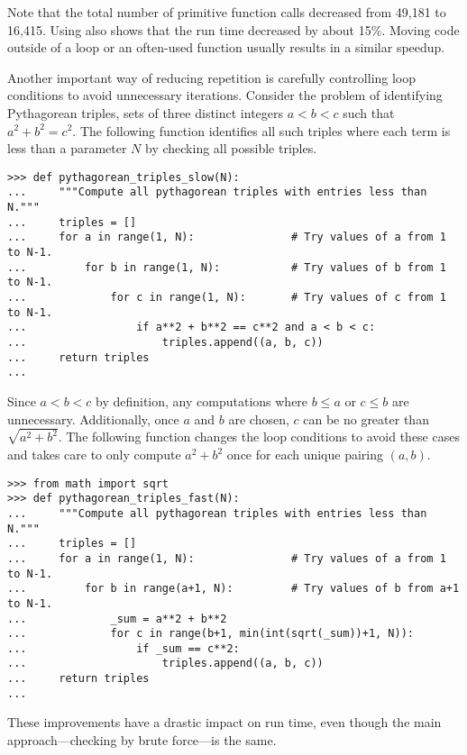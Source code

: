 Note that the total number of primitive function calls decreased from 49,181 to 16,415.
Using  also shows that the run time decreased by about 15\%.
Moving code outside of a loop or an often-used function usually results in a similar speedup.

Another important way of reducing repetition is carefully controlling loop conditions to avoid unnecessary iterations.
Consider the problem of identifying Pythagorean triples, sets of three distinct integers $a < b < c$ such that $a^2 + b^2 = c^2$.
The following function identifies all such triples where each term is less than a parameter $N$ by checking all possible triples.

\begin{lstlisting}
>>> def pythagorean_triples_slow(N):
...     """Compute all pythagorean triples with entries less than N."""
...     triples = []
...     for a in range(1, N):               # Try values of a from 1 to N-1.
...         for b in range(1, N):           # Try values of b from 1 to N-1.
...             for c in range(1, N):       # Try values of c from 1 to N-1.
...                 if a**2 + b**2 == c**2 and a < b < c:
...                     triples.append((a, b, c))
...     return triples
...
\end{lstlisting}

Since $a < b < c$ by definition, any computations where $b \le a$ or $c \le b$ are unnecessary.
Additionally, once $a$ and $b$ are chosen, $c$ can be no greater than $\sqrt{a^2 + b^2}$.
The following function changes the loop conditions to avoid these cases and takes care to only compute $a^2 + b^2$ once for each unique pairing $(a,b)$.

\begin{lstlisting}
>>> from math import sqrt
>>> def pythagorean_triples_fast(N):
...     """Compute all pythagorean triples with entries less than N."""
...     triples = []
...     for a in range(1, N):               # Try values of a from 1 to N-1.
...         for b in range(a+1, N):         # Try values of b from a+1 to N-1.
...             _sum = a**2 + b**2
...             for c in range(b+1, min(int(sqrt(_sum))+1, N)):
...                 if _sum == c**2:
...                     triples.append((a, b, c))
...     return triples
...
\end{lstlisting}

These improvements have a drastic impact on run time, even though the main approach---checking by brute force---is the same.


